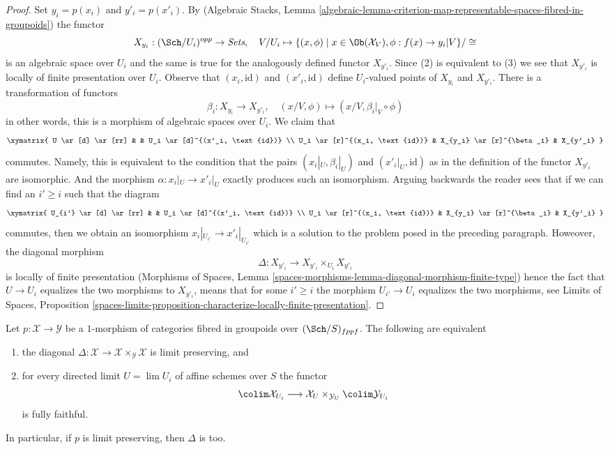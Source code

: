 \begin{proof}
\medskip\noindent
Set $y_i = p(x_i)$ and $y'_i = p(x'_i)$.
By (Algebraic Stacks, Lemma
\ref{algebraic-lemma-criterion-map-representable-spaces-fibred-in-groupoids})
the functor
$$
X_{y_i} : (\Sch/U_i)^{opp} \to \textit{Sets},\quad
V/U_i \mapsto
\{(x, \phi) \mid x \in \Ob(\mathcal{X}_V), \phi : f(x) \to y_i|V\}/\cong
$$
is an algebraic space over $U_i$ and the same is true for the
analogously defined functor $X_{y'_i}$. Since (2) is equivalent to (3)
we see that $X_{y'_i}$ is locally of finite presentation over $U_i$.
Observe that $(x_i, \text{id})$ and $(x'_i, \text{id})$ define
$U_i$-valued points of $X_{y_i}$ and $X_{y'_i}$.
There is a transformation of functors
$$
\beta_i : X_{y_i} \to X_{y'_i},\quad
(x/V, \phi) \mapsto (x/V, \beta_i|_V \circ \phi)
$$
in other words, this is a morphism of algebraic spaces over $U_i$.
We claim that
$$
\xymatrix{
U \ar[d] \ar[rr] & & U_i \ar[d]^{(x'_i, \text{id})} \\
U_i \ar[r]^{(x_i, \text{id})} & X_{y_i} \ar[r]^{\beta_i} & X_{y'_i}
}
$$
commutes. Namely, this is equivalent to the condition that
the pairs $(x_i|_U, \beta_i|_U)$ and $(x'_i|_U, \text{id})$
as in the definition of the functor $X_{y'_i}$ are isomorphic.
And the morphism $\alpha : x_i|_U \to x'_i|_U$ exactly produces
such an isomorphism. Arguing backwards the reader sees that
if we can find an $i' \geq i$ such that the diagram
$$
\xymatrix{
U_{i'} \ar[d] \ar[rr] & & U_i \ar[d]^{(x'_i, \text{id})} \\
U_i \ar[r]^{(x_i, \text{id})} & X_{y_i} \ar[r]^{\beta_i} & X_{y'_i}
}
$$
commutes, then we obtain an isomorphism $x_i|_{U_{i'}} \to x'_i|_{U_{i'}}$
which is a solution to the problem posed in the preceding paragraph.
Howeover, the diagonal morphism
$$
\Delta : X_{y'_i} \to X_{y'_i} \times_{U_i} X_{y'_i}
$$
is locally of finite presentation (Morphisms of Spaces, Lemma
\ref{spaces-morphisms-lemma-diagonal-morphism-finite-type})
hence the fact that $U \to U_i$ equalizes the two morphisms to $X_{y'_i}$,
means that for some $i' \geq i$ the morphism $U_{i'} \to U_i$
equalizes the two morphisms, see
Limits of Spaces, Proposition
\ref{spaces-limits-proposition-characterize-locally-finite-presentation}.
\end{proof}

\begin{lemma}
\label{lemma-limit-preserving-diagonal}
Let $p : \mathcal{X} \to \mathcal{Y}$ be a $1$-morphism of categories
fibred in groupoids over $(\Sch/S)_{fppf}$. The following are equivalent
\begin{enumerate}
\item the diagonal
$\Delta : \mathcal{X} \to \mathcal{X} \times_\mathcal{Y} \mathcal{X}$
is limit preserving, and
\item for every directed limit $U = \lim U_i$ of affine schemes over $S$
the functor
$$
\colim \mathcal{X}_{U_i} \longrightarrow
\mathcal{X}_U \times_{\mathcal{Y}_U} \colim \mathcal{Y}_{U_i}
$$
is fully faithful.
\end{enumerate}
In particular, if $p$ is limit preserving, then $\Delta$ is too.
\end{lemma}

